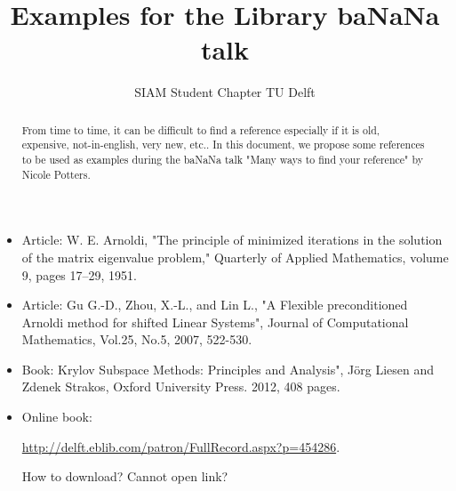 \documentclass[a4paper,10pt]{article}
\title{Examples for the Library baNaNa talk}
\author{SIAM Student Chapter TU Delft}
\begin{document}
\maketitle

\begin{abstract}
From time to time, it can be difficult to find a reference especially if it is old, expensive, not-in-english, very new, etc..
In this document, we propose some references to be used as examples during the baNaNa talk "Many ways to find your reference" by Nicole Potters.
\end{abstract}
\begin{itemize}
 \item Article: W. E. Arnoldi, "The principle of minimized iterations in the solution of the matrix eigenvalue problem," Quarterly of Applied Mathematics, volume 9, pages 17--29, 1951.
\item Article: Gu G.-D., Zhou, X.-L., and Lin L., "A Flexible preconditioned Arnoldi method for shifted Linear Systems", Journal of Computational Mathematics, Vol.25, No.5, 2007, 522-530.
\item Book: Krylov Subspace Methods: Principles and Analysis", J\"{o}rg Liesen and Zdenek Strakos, Oxford University Press. 2012, 408 pages.
\item Online book: 

\url{http://delft.eblib.com/patron/FullRecord.aspx?p=454286}. 

How to download? Cannot open link?


 \end{itemize}
\end{document}

